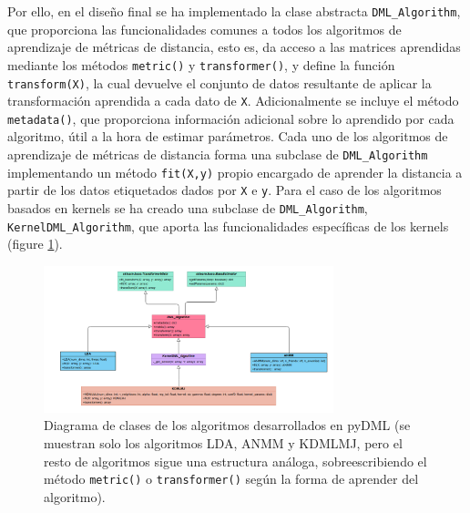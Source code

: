 Por ello, en el diseño final se ha implementado la clase abstracta \texttt{DML\_Algorithm}, que proporciona las funcionalidades comunes a todos los algoritmos de aprendizaje de métricas de distancia, esto es, da acceso a las matrices aprendidas mediante los métodos \texttt{metric()} y \texttt{transformer()}, y define la función \texttt{transform(X)}, la cual devuelve el conjunto de datos resultante de aplicar la transformación aprendida a cada dato de \texttt{X}. Adicionalmente se incluye el método \texttt{metadata()}, que proporciona información adicional sobre lo aprendido por cada algoritmo, útil a la hora de estimar parámetros. Cada uno de los algoritmos de aprendizaje de métricas de distancia forma una subclase de \texttt{DML\_Algorithm} implementando un método \texttt{fit(X,y)} propio encargado de aprender la distancia a partir de los datos etiquetados dados por \texttt{X} e \texttt{y}. Para el caso de los algoritmos basados en kernels se ha creado una subclase de \texttt{DML\_Algorithm}, \texttt{KernelDML\_Algorithm}, que aporta las funcionalidades específicas de los kernels (figure \ref{fig:diag_clases_pyDML}). 

\begin{figure} 
    \centering
    \includegraphics[width=0.75\textwidth]{images/uml_pydml.png}
    \caption{Diagrama de clases de los algoritmos desarrollados en pyDML (se muestran solo los algoritmos LDA, ANMM y KDMLMJ, pero el resto de algoritmos sigue una estructura análoga, sobreescribiendo el método \texttt{metric()} o \texttt{transformer()} según la forma de aprender del algoritmo).} \label{fig:diag_clases_pyDML}
\end{figure}

